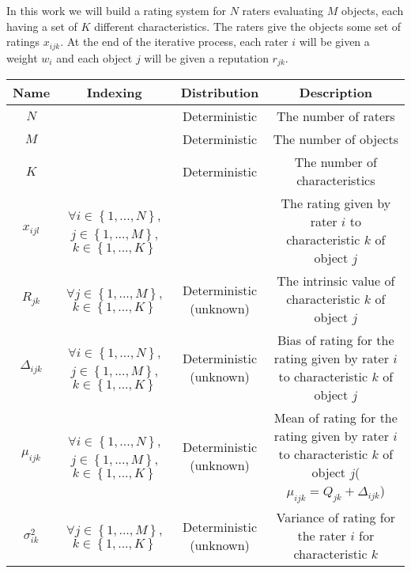 In this work we will build a rating system for $N$ raters evaluating $M$ objects, each having a set of $K$ different characteristics. 
The raters give the objects some set of ratings $x_{ijk}$.
At the end of the iterative process, each rater $i$ will be given a weight $w_i$ and each object $j$ will be given a reputation $r_{jk}$.
\begin{table}
\begin{tabular}{|c|c|c|c|}
\hline 
Name & Indexing & Distribution & Description \\ 
\hline
$N$ &  & Deterministic & The number of raters \\ 

$M$ &  & Deterministic & The number of objects \\ 
$K$ &  & Deterministic & The number of characteristics \\ 
$x_{ijl}$ & \parbox[t]{3cm}{$\forall i \in \left\lbrace 1,...,N\right\rbrace$,\newline
$j \in \left\lbrace 1,...,M\right\rbrace$,\newline
$k \in \left\lbrace 1,...,K\right\rbrace$ } &  & \parbox[t]{5cm}{The rating given by rater $i$ to characteristic $k$ of object $j$} \\ 
$R_{jk}$ & 
\parbox[t]{3cm}{$\forall j \in \left\lbrace 1,...,M\right\rbrace$,\newline
$k \in \left\lbrace 1,...,K\right\rbrace$ } & Deterministic (unknown) & \parbox[t]{5cm}{The intrinsic value of characteristic $k$ of object $j$}\\ 
$\Delta_{ijk}$ & 
\parbox[t]{3cm}{$\forall i \in \left\lbrace 1,...,N\right\rbrace$,\newline
$j \in \left\lbrace 1,...,M\right\rbrace$,\newline
$k \in \left\lbrace 1,...,K\right\rbrace$ } & Deterministic (unknown)
& \parbox[t]{5cm}{Bias of rating for the rating given by rater $i$ to characteristic $k$ of object $j$} \\
$\mu_{ijk}$ & 
\parbox[t]{3cm}{$\forall i \in \left\lbrace 1,...,N\right\rbrace$,\newline
$j \in \left\lbrace 1,...,M\right\rbrace$,\newline
$k \in \left\lbrace 1,...,K\right\rbrace$ } & 
Deterministic (unknown) 
& \parbox[t]{5cm}{Mean of rating for the rating given by rater $i$ to characteristic $k$ of object $j$($\mu_{ijk} = Q_{jk} + \Delta_{ijk}$)}\\
$\sigma_{ik}^2$ &
\parbox[t]{3cm}{$\forall j \in \left\lbrace 1,...,M\right\rbrace$,\newline
$k \in \left\lbrace 1,...,K\right\rbrace$ }
 & Deterministic (unknown) & \parbox[t]{5cm}{Variance of rating for the rater $i$ for characteristic $k$}\\


\end{tabular}
\end{table}
